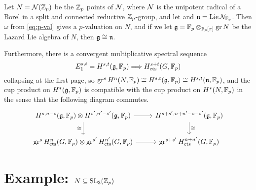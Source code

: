 \begin{theorem}
  Let $N = \mathcal{N}(\mathbb{Z}_{p})$ be the $\mathbb{Z}_{p}$ points of $\mathcal{N}$, where $\mathcal{N}$ is the unipotent radical of a Borel in a split and connected reductive $\mathbb{Z}_{p}$-group, and let and $\mathfrak{n} = \operatorname{Lie}{\mathcal{N}_{\mathbb{F}_{p}}}$. Then $\omega$ from \eqref{eq:p-val} gives a $p$-valuation on $N$, and if we let $\mathfrak{g} = \mathbb{F}_{p} \otimes_{\mathbb{F}_{p}[\pi]} \operatorname{gr} N$ be the Lazard Lie algebra of $N$, then $\mathfrak{g} \cong \mathfrak{n}$.

  Furthermore, there is a convergent multiplicative spectral sequence
  \[
    E_1^{s,t} = H^{s,t}(\mathfrak{g},\mathbb{F}_{p}) \Longrightarrow H_{\mathrm{cts}}^{s+t}(G,\mathbb{F}_{p})
  \]
  collapsing at the first page, so $\operatorname{gr}^{s} H^{n}(N,\mathbb{F}_{p}) \cong H^{s,t}(\mathfrak{g},\mathbb{F}_{p}) \cong H^{s,t}(\mathfrak{n},\mathbb{F}_{p})$, and the cup product on $H^{*}(\mathfrak{g},\mathbb{F}_{p})$ is compatible with the cup product on $H^{*}(N,\mathbb{F}_{p})$ in the sense that the following diagram commutes.
  \[
    \begin{tikzcd}
      H^{s,n-s}(\lie{g}, \F_{p}) \otimes H^{s',n'-s'}(\lie{g},\F_{p}) \ar[r] \ar[d,swap,"\iso"] & H^{s+s',n+n'-s-s'}(\lie{g},\F_{p}) \ar[d,"\iso"] \\
      \gr^s \Hc^n(G,\F_{p}) \otimes \gr^{s'} \Hc^{n'}(G,\F_{p}) \ar[r] & \gr^{s+s'}\Hc^{n+n'}(G,\F_{p})
    \end{tikzcd}
  \]
\end{theorem}


\section{Example: \texorpdfstring{$N \subseteq \operatorname{SL}_{3}(\mathbb{Z}_{p})$}{N in SL3(Zp)}}%
\label{sec:ex-N-in-SL3}

